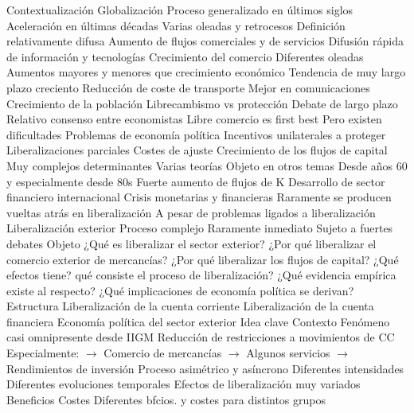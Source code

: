 \documentclass{nuevotema}
\begin{document}
\begin{esquemal}
	\1[] 
		\2 Contextualización
			\3 Globalización
				\4 Proceso generalizado en últimos siglos
				\4 Aceleración en últimas décadas
				\4 Varias oleadas y retrocesos
				\4 Definición relativamente difusa
				\4[] Aumento de flujos comerciales y de servicios
				\4[] Difusión rápida de información y tecnologías
			\3 Crecimiento del comercio
				\4 Diferentes oleadas
				\4[] Aumentos mayores y menores que crecimiento económico
				\4 Tendencia de muy largo plazo creciento
				\4[] Reducción de coste de transporte
				\4[] Mejor en comunicaciones
				\4[] Crecimiento de la población
			\3 Librecambismo vs protección
				\4 Debate de largo plazo
				\4 Relativo consenso entre economistas
				\4[] Libre comercio es first best
				\4 Pero existen dificultades
				\4[] Problemas de economía política
				\4[] Incentivos unilaterales a proteger
				\4[] Liberalizaciones parciales
				\4[] Costes de ajuste
			\3 Crecimiento de los flujos de capital
				\4 Muy complejos determinantes
				\4[] Varias teorías
				\4[] Objeto en otros temas
				\4 Desde años 60 y especialmente desde 80s
				\4[] Fuerte aumento de flujos de K
				\4 Desarrollo de sector financiero internacional
				\4 Crisis monetarias y financieras
				\4 Raramente se producen vueltas atrás en liberalización
				\4[] A pesar de problemas ligados a liberalización
			\3 Liberalización exterior
				\4 Proceso complejo
				\4 Raramente inmediato
				\4 Sujeto a fuertes debates
		\2 Objeto
			\3 ¿Qué es liberalizar el sector exterior?
			\3 ¿Por qué liberalizar el comercio exterior de mercancías?
			\3 ¿Por qué liberalizar los flujos de capital?
			\3 ¿Qué efectos tiene?
			\3 qué consiste el proceso de liberalización?
			\3 ¿Qué evidencia empírica existe al respecto?
			\3 ¿Qué implicaciones de economía política se derivan?
		\2 Estructura
			\3 Liberalización de la cuenta corriente
			\3 Liberalización de la cuenta financiera
			\3 Economía política del sector exterior
	\1 
		\2 Idea clave
			\3 Contexto
				\4 Fenómeno casi omnipresente desde IIGM
				\4[] Reducción de restricciones a movimientos de CC
				\4[] Especialmente:
				\4[] $\to$ Comercio de mercancías
				\4[] $\to$ Algunos servicios
				\4[] $\to$ Rendimientos de inversión
				\4 Proceso asimétrico y asíncrono
				\4[] Diferentes intensidades
				\4[] Diferentes evoluciones temporales
				\4 Efectos de liberalización muy variados
				\4[] Beneficios
				\4[] Costes
				\4[] Diferentes bfcios. y costes para distintos grupos

\end{esquemal}
\end{document}

